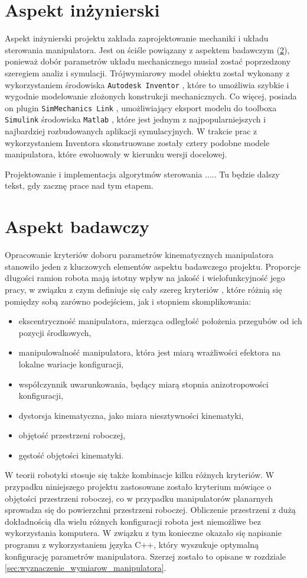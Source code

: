 \documentclass[printmode]{mgr}
\begin{document}
\section{Aspekt inżynierski}
Aspekt inżynierski projektu zakłada zaprojektowanie mechaniki i układu sterowania manipulatora. Jest on ściśle powiązany
z aspektem badawczym (\ref{sec:aspekt_badawczy}), ponieważ dobór parametrów układu mechanicznego musiał zostać poprzedzony
szeregiem analiz i symulacji. Trójwymiarowy model obiektu został wykonany z wykorzystaniem środowiska \texttt{Autodesk Inventor} \cite{autodesk},
które to umożliwia szybkie i wygodnie modelowanie złożonych konstrukcji mechanicznych. Co więcej, posiada on plugin
\texttt{SimMechanics Link} \cite{simmechanics_link}, umożliwiający eksport modelu do toolboxa \texttt{Simulink} środowiska 
\texttt{Matlab} \cite{mathworks}, które jest jednym z najpopularniejszych i najbardziej rozbudowanych aplikacji symulacyjnych.
W trakcie prac z wykorzystaniem Inventora skonstruowane zostały cztery podobne modele manipulatora, które ewoluowały 
w kierunku wersji docelowej. 

Projektowanie i implementacja algorytmów sterowania ..... Tu będzie dalszy tekst, gdy zacznę prace nad tym etapem.

\section{Aspekt badawczy}\label{sec:aspekt_badawczy}
Opracowanie kryteriów doboru parametrów kinematycznych manipulatora stanowiło jeden z kluczowych elementów aspektu badawczego projektu.
Proporcje długości ramion robota mają istotny wpływ na jakość i wielofunkcyjność jego pracy, w związku z czym definiuje się cały
szereg kryteriów \cite{miary_jakosci}, które różnią się pomiędzy sobą zarówno podejściem, jak i stopniem skomplikowania:
\begin{itemize}
\item ekscentryczność manipulatora, mierząca odległość położenia przegubów od ich pozycji środkowych,
\item manipulowalność manipulatora, która jest miarą wrażliwości efektora na lokalne wariacje konfiguracji,
\item współczynnik uwarunkowania, będący miarą stopnia anizotropowości konfiguracji,
\item dystorsja kinematyczna, jako miara niesztywności kinematyki,
\item objętość przestrzeni roboczej,
\item gęstość objętości kinematyki.
\end{itemize}
W teorii robotyki stosuje się także kombinacje kilku różnych kryteriów. W przypadku niniejszego projektu zastosowane zostało
kryterium mówiące o objętości przestrzeni roboczej, co w przypadku manipulatorów planarnych sprowadza się do powierzchni przestrzeni roboczej. 
Obliczenie przestrzeni z dużą dokładnością dla wielu różnych konfiguracji robota jest niemożliwe bez wykorzystania komputera. W związku
z tym konieczne okazało się napisanie programu z wykorzystaniem języka C++, który wyszukuje optymalną konfigurację parametrów manipulatora. 
Szerzej zostało to opisane w rozdziale \ref{sec:wyznaczenie_wymiarow_manipulatora}.
\end{document}
